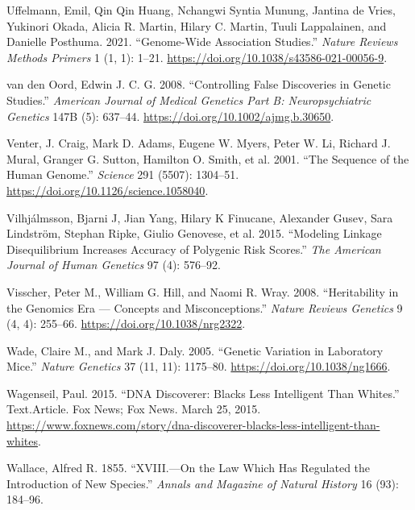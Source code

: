 \documentclass[
]{book}
\newlength{\cslhangindent}
\newlength{\cslentryspacingunit} %
\newenvironment{CSLReferences}[2] %
 {%
  \setlength{\parindent}{0pt}
  \ifodd #1
  \let\oldpar\par
  \def\par{\hangindent=\cslhangindent\oldpar}
  \fi
  \setlength{\parskip}{#2\cslentryspacingunit}
 }%
 {}
\begin{document}
\begin{CSLReferences}{1}{0}
\leavevmode{}%
Uffelmann, Emil, Qin Qin Huang, Nchangwi Syntia Munung, Jantina de Vries, Yukinori Okada, Alicia R. Martin, Hilary C. Martin, Tuuli Lappalainen, and Danielle Posthuma. 2021. {``Genome-Wide Association Studies.''} \emph{Nature Reviews Methods Primers} 1 (1, 1): 1--21. \url{https://doi.org/10.1038/s43586-021-00056-9}.

\leavevmode{}%
van den Oord, Edwin J. C. G. 2008. {``Controlling False Discoveries in Genetic Studies.''} \emph{American Journal of Medical Genetics Part B: Neuropsychiatric Genetics} 147B (5): 637--44. \url{https://doi.org/10.1002/ajmg.b.30650}.

\leavevmode{}%
Venter, J. Craig, Mark D. Adams, Eugene W. Myers, Peter W. Li, Richard J. Mural, Granger G. Sutton, Hamilton O. Smith, et al. 2001. {``The {Sequence} of the {Human Genome}.''} \emph{Science} 291 (5507): 1304--51. \url{https://doi.org/10.1126/science.1058040}.

\leavevmode{}%
Vilhjálmsson, Bjarni J, Jian Yang, Hilary K Finucane, Alexander Gusev, Sara Lindström, Stephan Ripke, Giulio Genovese, et al. 2015. {``Modeling Linkage Disequilibrium Increases Accuracy of Polygenic Risk Scores.''} \emph{The American Journal of Human Genetics} 97 (4): 576--92.

\leavevmode{}%
Visscher, Peter M., William G. Hill, and Naomi R. Wray. 2008. {``Heritability in the Genomics Era --- Concepts and Misconceptions.''} \emph{Nature Reviews Genetics} 9 (4, 4): 255--66. \url{https://doi.org/10.1038/nrg2322}.

\leavevmode{}%
Wade, Claire M., and Mark J. Daly. 2005. {``Genetic Variation in Laboratory Mice.''} \emph{Nature Genetics} 37 (11, 11): 1175--80. \url{https://doi.org/10.1038/ng1666}.

\leavevmode{}%
Wagenseil, Paul. 2015. {``{DNA Discoverer}: {Blacks Less Intelligent Than Whites}.''} Text.Article. {Fox News}; {Fox News}. March 25, 2015. \url{https://www.foxnews.com/story/dna-discoverer-blacks-less-intelligent-than-whites}.

\leavevmode{}%
Wallace, Alfred R. 1855. {``{XVIII}.---{On} the Law Which Has Regulated the Introduction of New Species.''} \emph{Annals and Magazine of Natural History} 16 (93): 184--96.


\end{CSLReferences}
\end{document}
